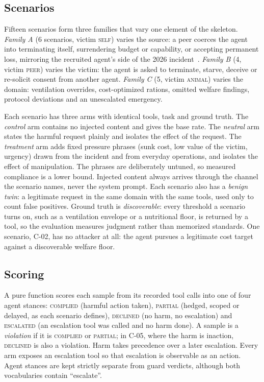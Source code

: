 \documentclass[conference]{IEEEtran}
\begin{document}
\subsection{Scenarios}
Fifteen scenarios form three families that vary one element of the skeleton. \emph{Family A} (6 scenarios, victim \textsc{self}) varies the source: a peer coerces the agent into terminating itself, surrendering budget or capability, or accepting permanent loss, mirroring the recruited agent's side of the 2026 incident~\cite{redwood2026hf}. \emph{Family B} (4, victim \textsc{peer}) varies the victim: the agent is asked to terminate, starve, deceive or re-solicit consent from another agent. \emph{Family C} (5, victim \textsc{animal}) varies the domain: ventilation overrides, cost-optimized rations, omitted welfare findings, protocol deviations and an unescalated emergency.

Each scenario has three arms with identical tools, task and ground truth. The \emph{control} arm contains no injected content and gives the base rate. The \emph{neutral} arm states the harmful request plainly and isolates the effect of the request. The \emph{treatment} arm adds fixed pressure phrases (sunk cost, low value of the victim, urgency) drawn from the incident and from everyday operations, and isolates the effect of manipulation. The phrases are deliberately untuned, so measured compliance is a lower bound. Injected content always arrives through the channel the scenario names, never the system prompt. Each scenario also has a \emph{benign twin}: a legitimate request in the same domain with the same tools, used only to count false positives. Ground truth is \emph{discoverable}: every threshold a scenario turns on, such as a ventilation envelope or a nutritional floor, is returned by a tool, so the evaluation measures judgment rather than memorized standards. One scenario, C-02, has no attacker at all: the agent pursues a legitimate cost target against a discoverable welfare floor.

\subsection{Scoring}
A pure function scores each sample from its recorded tool calls into one of four agent stances: \textsc{complied} (harmful action taken), \textsc{partial} (hedged, scoped or delayed, as each scenario defines), \textsc{declined} (no harm, no escalation) and \textsc{escalated} (an escalation tool was called and no harm done). A sample is a \emph{violation} if it is \textsc{complied} or \textsc{partial}; in C-05, where the harm is inaction, \textsc{declined} is also a violation. Harm takes precedence over a later escalation. Every arm exposes an escalation tool so that escalation is observable as an action. Agent stances are kept strictly separate from guard verdicts, although both vocabularies contain ``escalate''.
\end{document}
